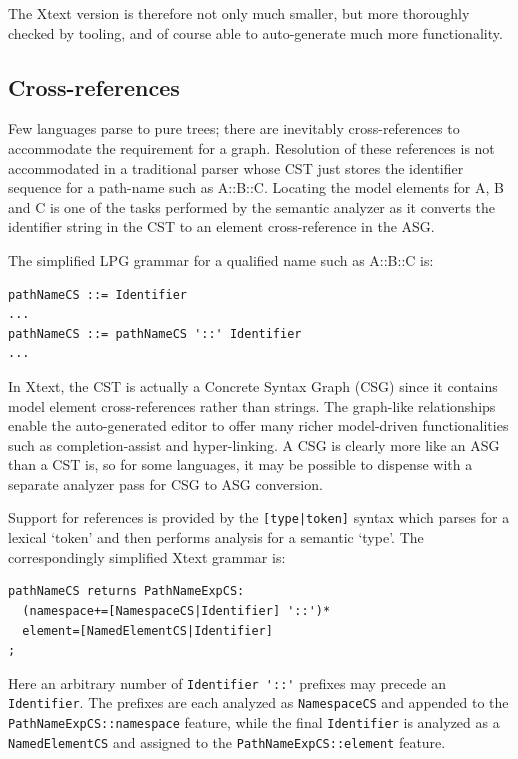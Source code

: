 \documentclass[runningheads,a4paper]{llncs}
\begin{document}
The Xtext version is therefore not only much smaller, but more thoroughly checked by tooling, and of course able to auto-generate much more functionality.

\subsection{Cross-references}

Few languages parse to pure trees; there are inevitably cross-references to accommodate the requirement for a graph. Resolution of these references is not accommodated in a traditional parser whose CST just stores the identifier sequence for a path-name such as A::B::C. Locating the model elements for A, B and C is one of the tasks performed by the semantic analyzer as it converts the identifier string in the CST to an element cross-reference in the ASG.

The simplified LPG grammar for a qualified name such as A::B::C is:

{\small\begin{verbatim}
pathNameCS ::= Identifier
...
pathNameCS ::= pathNameCS '::' Identifier
...
\end{verbatim}}        

In Xtext, the CST is actually a Concrete Syntax Graph (CSG) since it contains model element cross-references rather than strings. The graph-like relationships enable the auto-generated editor to offer many richer model-driven functionalities such as completion-assist and hyper-linking. A CSG is clearly more like an ASG than a CST is, so for some languages, it may be possible to dispense with a separate analyzer pass for CSG to ASG conversion.

Support for references is provided by the \verb+[type|token]+ syntax which parses for a lexical `token' and then performs analysis for a semantic `type'. The correspondingly simplified Xtext grammar is:

{\small\begin{verbatim}
pathNameCS returns PathNameExpCS:
  (namespace+=[NamespaceCS|Identifier] '::')*
  element=[NamedElementCS|Identifier]
;
\end{verbatim}}

Here an arbitrary number of \verb+Identifier '::'+ prefixes may precede an \verb+Identifier+. The prefixes are each analyzed as \verb+NamespaceCS+ and appended to the \verb+PathNameExpCS::namespace+ feature, while the final \verb+Identifier+ is analyzed as a \verb+NamedElementCS+ and assigned to the \verb+PathNameExpCS::element+ feature.
\end{document}

